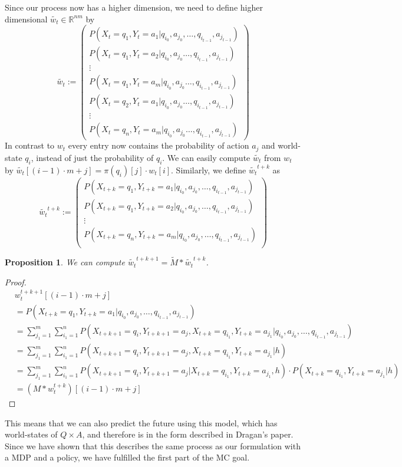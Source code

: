 \documentclass{article}
\newtheorem{prop}{Proposition}
\theoremstyle{definition}
\begin{document}
Since our process now has a higher dimension, we need to define higher dimensional $\widetilde{w_t}\in \mathbb{R}^{nm}$ by
\[
\widetilde{w_t}:=\left ( 
\begin{matrix} 
P(X_t=q_1,Y_t=a_1|q_{i_0},a_{j_0},\ldots,q_{i_{t-1}},a_{j_{t-1}}) \\
P(X_t=q_1,Y_t=a_2|q_{i_0},a_{j_0}\ldots,q_{i_{t-1}},a_{j_{t-1}}) \\
\vdots \\
P(X_t=q_1,Y_t=a_m|q_{i_0},a_{j_0}\ldots,q_{i_{t-1}},a_{j_{t-1}}) \\
P(X_t=q_2,Y_t=a_1|q_{i_0},a_{j_0}\ldots,q_{i_{t-1}},a_{j_{t-1}}) \\ 
\vdots \\
P(X_t=q_n,Y_t=a_m|q_{i_0},a_{j_0}\ldots,q_{i_{t-1}},a_{j_{t-1}})
\end{matrix} 
\right )
\]
In contrast to $w_t$ every entry now contains the probability of action $a_j$ and world-state $q_i$, instead of just the probability of $q_i$. We can easily compute $\widetilde{w_t}$ from $w_t$ by $\widetilde{w_t}[(i-1) \cdot m+j]=\pi(q_i)[j]\cdot w_t[i]$.
Similarly, we define $\widetilde{w_t}^{t+k}$ as 
\[
\widetilde{w_t}^{t+k}:=
\left ( 
\begin{matrix}
P(X_{t+k}=q_1,Y_{t+k}=a_1|q_{i_0},a_{j_0},\ldots,q_{i_{t-1}},a_{j_{t-1}}) \\
P(X_{t+k}=q_1,Y_{t+k}=a_2|q_{i_0},a_{j_0},\ldots,q_{i_{t-1}},a_{j_{t-1}}) \\
\vdots \\
P(X_{t+k}=q_n,Y_{t+k}=a_m|q_{i_0},a_{j_0},\ldots,q_{i_{t-1}},a_{j_{t-1}}) \\
\end{matrix}
\right )
\]
\begin{prop} We can compute $\widetilde{w_t}^{t+k+1}=\widetilde{M}*\widetilde{w_t}^{t+k}$.
\end{prop}
\begin{proof}
\begin{align*}
&w_t^{t+k+1}[(i-1)\cdot m+j] \\&=P(X_{t+k}=q_1,Y_{t+k}=a_1|q_{i_0},a_{j_0},\ldots,q_{i_{t-1}},a_{j_{t-1}}) \\
&=\sum\limits_{j_1=1}^{m} \sum\limits_{i_1=1}^{n} P(X_{t+k+1}=q_i,Y_{t+k+1}=a_j,X_{t+k}=q_{i_1},Y_{t+k}=a_{j_1}|q_{i_0},a_{j_0},\ldots,q_{i_{t-1}},a_{j_{t-1}})\\
&=\sum\limits_{j_1=1}^{m} \sum\limits_{i_1=1}^{n} P(X_{t+k+1}=q_i,Y_{t+k+1}=a_j,X_{t+k}=q_{i_1},Y_{t+k}=a_{j_1}|h) \\
&=\sum\limits_{j_1=1}^{m} \sum\limits_{i_1=1}^{n} P(X_{t+k+1}=q_i,Y_{t+k+1}=a_j|X_{t+k}=q_{i_1},Y_{t+k}=a_{j_1},h)\cdot P(X_{t+k}=q_{i_1},Y_{t+k}=a_{j_1}|h) \\
&=(M*w_t^{t+k})[(i-1) \cdot m+j]
\end{align*}
\end{proof}
This means that we can also predict the future using this model, which has world-states of $Q\times A$, and therefore is in the form described in Dragan's paper. Since we have shown that this describes the same process as our formulation with a MDP and a policy, we have fulfilled the first part of the MC goal. 
\end{document}
